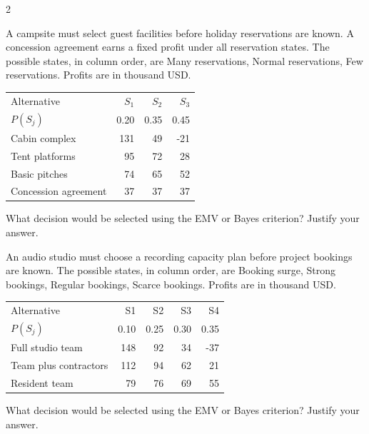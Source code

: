 \begin{multicols}{2}
\begin{minipage}{\linewidth}
A campsite must select guest facilities before holiday reservations are known. A concession agreement earns a fixed profit under all reservation states. The possible states, in column order, are Many reservations, Normal reservations, Few reservations. Profits are in thousand USD.
\begin{center}\small\setlength{\tabcolsep}{4pt}
\begin{tabular}{@{}lrrr@{}}\toprule
Alternative&$S_1$&$S_2$&$S_3$\\
$P(S_j)$&0.20&0.35&0.45\\\midrule
Cabin complex&131&49&-21\\
Tent platforms&95&72&28\\
Basic pitches&74&65&52\\
Concession agreement&37&37&37\\\bottomrule
\end{tabular}\end{center}

What decision would be selected using the EMV or Bayes criterion? Justify your answer. 
\end{minipage}\par

\begin{minipage}{\linewidth}
An audio studio must choose a recording capacity plan before project bookings are known. The possible states, in column order, are Booking surge, Strong bookings, Regular bookings, Scarce bookings. Profits are in thousand USD.
\begin{center}\small\setlength{\tabcolsep}{4pt}
\begin{tabular}{@{}lrrrr@{}}\toprule
Alternative&S1&S2&S3&S4\\
$P(S_j)$&0.10&0.25&0.30&0.35\\\midrule
Full studio team&148&92&34&-37\\
Team plus contractors&112&94&62&21\\
Resident team&79&76&69&55\\\bottomrule
\end{tabular}\end{center}

What decision would be selected using the EMV or Bayes criterion? Justify your answer. 
\end{minipage}\par



\end{multicols}
